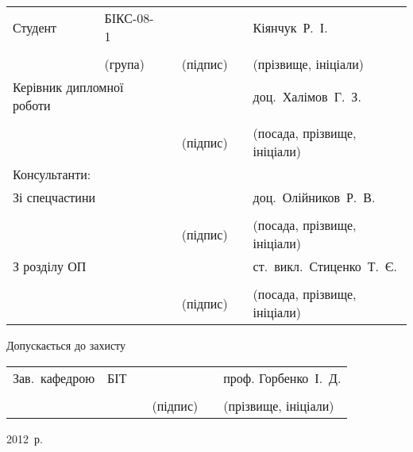 \begin{titlepage}
\begin{center}
        \begin{tabular}{ 
            p{}
            >{\centering\arraybackslash}p{} 
            >{\centering\arraybackslash}p{} 
            >{\centering\arraybackslash}p{}
            >{\centering\arraybackslash}p{} 
            >{\centering\arraybackslash}p{}}
            Студент & БІКС-08-1 & & & & Кіянчук~Р.~І. \\ \cline{2-2}\cline{4-4}\cline{6-6} \\[-4ex]
            & {\scriptsize (група)} & & {\scriptsize (підпис)} & & {\scriptsize (прізвище, ініціали)} \\[1ex]
            \multicolumn{2}{p{0.4\textwidth}}{Керівник дипломної роботи} & & & & доц.~Халімов~Г.~З. \\ \cline{4-4}\cline{6-6} \\[-4ex]
            & & & {\scriptsize (підпис)} & & {\scriptsize (посада, прізвище, ініціали)} \\
            Консультанти: & & & & & \\[1ex]
            \multicolumn{2}{p{0.4\textwidth}}{Зі спецчастини} & & & & доц.~Олійников~Р.~В. \\ \cline{4-4}\cline{6-6} \\[-4ex]
            & & & {\scriptsize (підпис)} & & {\scriptsize (посада, прізвище, ініціали)} \\[1ex]
            \multicolumn{2}{p{0.4\textwidth}}{З розділу ОП} & & & & \mbox{ст.~викл.~Стиценко~Т.~Є.} \\ \cline{4-4}\cline{6-6} \\[-4ex]
            & & & {\scriptsize (підпис)} & & {\scriptsize (посада, прізвище, ініціали)} \\[1ex]
        \end{tabular}

        \vfill
        \begin{flushleft}
            \hspace{4ex}Допускається до захисту \\[1ex]
        \end{flushleft}
        \begin{tabular}{ 
            p{}
            >{\centering\arraybackslash}p{} 
            >{\centering\arraybackslash}p{} 
            >{\centering\arraybackslash}p{}
            >{\centering\arraybackslash}p{} 
            >{\centering\arraybackslash}p{}}
            \mbox{Зав. кафедрою} & БІТ & & & & проф. Горбенко~І.~Д. \\ \cline{2-2}\cline{4-4}\cline{6-6} \\[-4ex]
            & & & {\scriptsize (підпис)} & & {\scriptsize (прізвище, ініціали)} \\[1ex]
        \end{tabular}
        \vfill
        2012~р.
    \end{center}
\end{titlepage}
\newpage

\addtocounter{page}{1}
